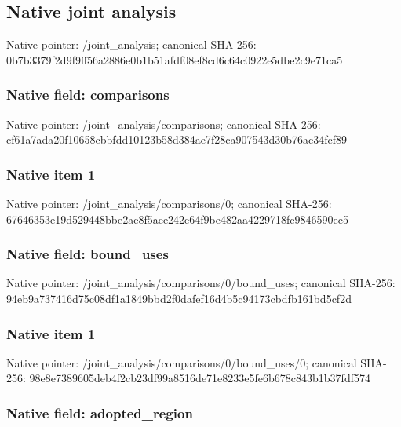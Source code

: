 \documentclass[10pt,a4paper]{article}
\begin{document}
\subsection{Native joint analysis}


Native pointer: /joint\_analysis; canonical SHA-256: 0b7b3379f2d9f9ff56a2886e\allowbreak{}0b1b51afdf08ef8cd6c64c09\allowbreak{}22e5dbe2c9e71ca5



\subsubsection{Native field: comparisons}


Native pointer: /joint\_analysis/comparisons; canonical SHA-256: cf61a7ada20f10658cbbfdd1\allowbreak{}0123b58d384ae7f28ca90754\allowbreak{}3d30b76ac34fcf89



\subsubsection{Native item 1}


Native pointer: /joint\_analysis/comparisons/0; canonical SHA-256: 67646353e19d529448bbe2ae\allowbreak{}8f5aee242e64f9be482aa422\allowbreak{}9718fc9846590ec5



\subsubsection{Native field: bound\_uses}


Native pointer: /joint\_analysis/comparis\allowbreak{}ons/0/bound\_uses; canonical SHA-256: 94eb9a737416d75c08df1a18\allowbreak{}49bbd2f0dafef16d4b5c9417\allowbreak{}3cbdfb161bd5cf2d



\subsubsection{Native item 1}


Native pointer: /joint\_analysis/comparis\allowbreak{}ons/0/bound\_uses/0; canonical SHA-256: 98e8e7389605deb4f2cb23df\allowbreak{}99a8516de71e8233e5fe6b67\allowbreak{}8c843b1b37fdf574



\subsubsection{Native field: adopted\_region}
\end{document}
